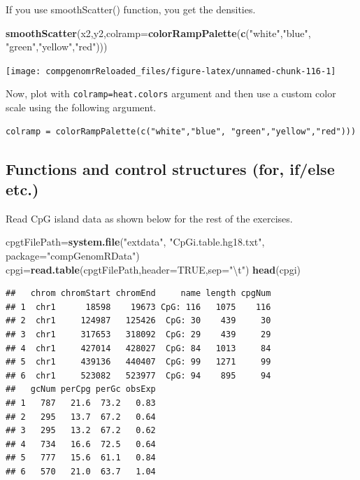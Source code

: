 \documentclass[12pt,]{krantz}
\newenvironment{Shaded}{\begin{snugshade}}{\end{snugshade}}
\newcommand{\CharTok}[1]{\textcolor[rgb]{0.31,0.60,0.02}{#1}}
\newcommand{\DataTypeTok}[1]{\textcolor[rgb]{0.13,0.29,0.53}{#1}}
\newcommand{\KeywordTok}[1]{\textcolor[rgb]{0.13,0.29,0.53}{\textbf{#1}}}
\newcommand{\NormalTok}[1]{#1}
\newcommand{\OtherTok}[1]{\textcolor[rgb]{0.56,0.35,0.01}{#1}}
\newcommand{\StringTok}[1]{\textcolor[rgb]{0.31,0.60,0.02}{#1}}
\theoremstyle{definition}
\theoremstyle{definition}
\theoremstyle{definition}
\theoremstyle{remark}
\begin{document}
If you use smoothScatter() function, you get the densities.

\begin{Shaded}
\begin{Highlighting}[]
\KeywordTok{smoothScatter}\NormalTok{(x2,y2,}\DataTypeTok{colramp=}\KeywordTok{colorRampPalette}\NormalTok{(}\KeywordTok{c}\NormalTok{(}\StringTok{"white"}\NormalTok{,}\StringTok{"blue"}\NormalTok{, }\StringTok{"green"}\NormalTok{,}\StringTok{"yellow"}\NormalTok{,}\StringTok{"red"}\NormalTok{))) }
\end{Highlighting}
\end{Shaded}

\begin{center}\texttt{[image: compgenomrReloaded\_files/figure-latex/unnamed-chunk-116-1]} \end{center}

Now, plot with \texttt{colramp=heat.colors} argument and then use a
custom color scale using the following argument.

\begin{verbatim}
colramp = colorRampPalette(c("white","blue", "green","yellow","red")))
\end{verbatim}

\hypertarget{functions-and-control-structures-for-ifelse-etc.-1}{%
\subsection{Functions and control structures (for, if/else
etc.)}\label{functions-and-control-structures-for-ifelse-etc.-1}}

Read CpG island data as shown below for the rest of the exercises.

\begin{Shaded}
\begin{Highlighting}[]
\NormalTok{cpgtFilePath=}\KeywordTok{system.file}\NormalTok{(}\StringTok{"extdata"}\NormalTok{,}
                \StringTok{"CpGi.table.hg18.txt"}\NormalTok{,}
                \DataTypeTok{package=}\StringTok{"compGenomRData"}\NormalTok{)}
\NormalTok{cpgi=}\KeywordTok{read.table}\NormalTok{(cpgtFilePath,}\DataTypeTok{header=}\OtherTok{TRUE}\NormalTok{,}\DataTypeTok{sep=}\StringTok{"}\CharTok{\textbackslash{}t}\StringTok{"}\NormalTok{)}
\KeywordTok{head}\NormalTok{(cpgi)}
\end{Highlighting}
\end{Shaded}

\begin{verbatim}
##   chrom chromStart chromEnd     name length cpgNum
## 1  chr1      18598    19673 CpG: 116   1075    116
## 2  chr1     124987   125426  CpG: 30    439     30
## 3  chr1     317653   318092  CpG: 29    439     29
## 4  chr1     427014   428027  CpG: 84   1013     84
## 5  chr1     439136   440407  CpG: 99   1271     99
## 6  chr1     523082   523977  CpG: 94    895     94
##   gcNum perCpg perGc obsExp
## 1   787   21.6  73.2   0.83
## 2   295   13.7  67.2   0.64
## 3   295   13.2  67.2   0.62
## 4   734   16.6  72.5   0.64
## 5   777   15.6  61.1   0.84
## 6   570   21.0  63.7   1.04
\end{verbatim}
\end{document}
